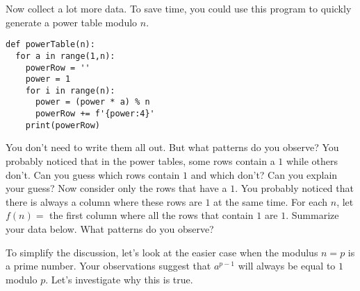 \documentclass[12pt]{exam}
\newcommand{\Z}{\mathbb Z}
\begin{document}
\begin{questions}
\begin{center}
  \end{center}
  \newpage
  \question Now collect a lot more data. To save time, you could use this program to quickly generate a power table modulo $n$.
  \begin{lstlisting}
def powerTable(n):
  for a in range(1,n):
    powerRow = ''
    power = 1
    for i in range(n):
      power = (power * a) % n
      powerRow += f'{power:4}'
    print(powerRow)
  \end{lstlisting}
  You don't need to write them all out. But what patterns do you observe?
  \newpage
  \question You probably noticed that in the power tables, some rows contain a $1$ while others don't. Can you guess which rows contain $1$ and which don't? Can you explain your guess?
  \vspace{2in}
  \question Now consider only the rows that have a $1$. You probably noticed that there is always a column where these rows are $1$ at the same time. For each $n$, let $f(n)=$ the first column where all the rows that contain $1$ are $1$. Summarize your data below. What patterns do you observe?
  \begin{center}
  \end{center}
  \newpage
  \question To simplify the discussion, let's look at the easier case when the modulus $n=p$ is a prime number. Your observations suggest that $a^{p-1}$ will always be equal to $1$ modulo $p$. Let's investigate why this is true.
\end{questions}
\end{document}
